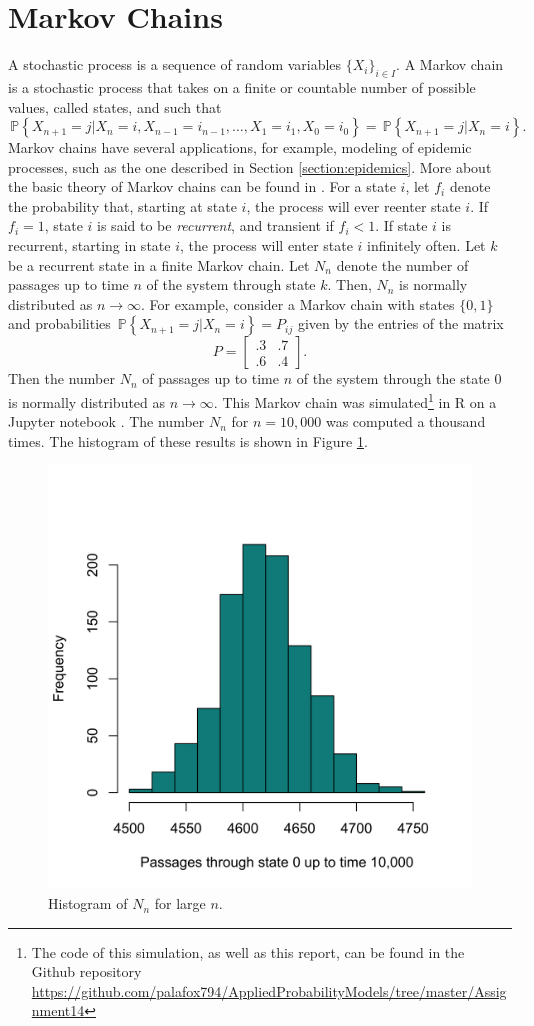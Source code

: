\documentclass[letterpaper, 10 pt, conference]{article}
\newcommand\pr[1]{\, \mathbb{P} \left\lbrace #1 \right\rbrace}
\begin{document}
\section{Markov Chains}\label{section:markov}
A stochastic process is a sequence of random variables $\lbrace X_i \rbrace_{i \in I}$. A Markov chain is a stochastic process that takes on a finite or countable number of possible values, called states, and such that 
\begin{equation}
	\pr{X_{n+1} = j | X_{n} = i, X_{n-1} = i_{n-1} , \dots, X_1 = i_1, X_0 = i_0} = \pr{X_{n+1} = j | X_{n} = i}.
\end{equation}
Markov chains have several applications, for example, modeling of epidemic processes, such as the one described in Section \ref{section:epidemics}. More about the basic theory of Markov chains can be found in \citet{Ross_2000, feller, lawler_2006}. For a state $i$, let $f_i$ denote the probability that, starting at state $i$, the process will ever reenter state $i$. If $f_i = 1$, state $i$ is said to be \textit{recurrent}, and transient if $f_i < 1$. If state $i$ is recurrent, starting in state $i$, the process will enter state $i$ infinitely often.
Let $k$ be a recurrent state in a finite Markov chain. Let $N_n$ denote the number of passages up to time $n$ of the system through state $k$. Then, $N_n$ is normally distributed as $n \rightarrow \infty$. For example,  consider a Markov chain with states $\lbrace 0, 1 \rbrace$ and probabilities $\pr{X_{n+1} = j | X_{n} = i} = P_{ij}$ given by the entries of the matrix
\begin{equation}
P = 
	\begin{bmatrix}
	.3 & .7 \\
	.6 & .4
	\end{bmatrix}.
\end{equation}
Then the number $N_{n}$ of passages up to time $n$ of the system through the state 0 is normally distributed as $n \rightarrow \infty$. This Markov chain was simulated\footnote{The code of this simulation, as well as this report, can be found in the Github repository \url{https://github.com/palafox794/AppliedProbabilityModels/tree/master/Assignment14}} in R \citep{R} on a Jupyter notebook \citep{jupyter}. The number $N_n$ for $n = 10,000$ was computed a thousand times. The histogram of these results is shown in Figure \ref{fig:hist}.

\begin{figure}
\centering
\includegraphics[width =.5\linewidth]{hist}
\caption{Histogram of $N_n$ for large $n$.}
\label{fig:hist}
\end{figure}
\end{document}
